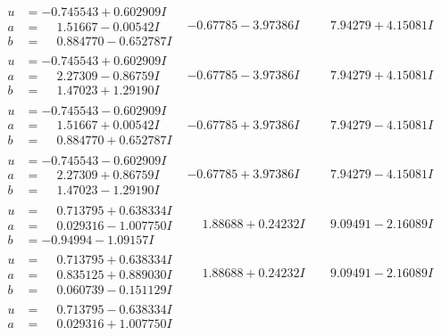 \documentclass[1p]{elsarticle_modified}
\theoremstyle{definition}
\begin{document}
$$\begin{array}{c|c|c}
\begin{aligned}
u &= -0.745543 + 0.602909 I \\
a &= \phantom{-}1.51667 - 0.00542 I \\
b &= \phantom{-}0.884770 - 0.652787 I\end{aligned}
 & -0.67785 - 3.97386 I & \phantom{-}7.94279 + 4.15081 I \\ \hline\begin{aligned}
u &= -0.745543 + 0.602909 I \\
a &= \phantom{-}2.27309 - 0.86759 I \\
b &= \phantom{-}1.47023 + 1.29190 I\end{aligned}
 & -0.67785 - 3.97386 I & \phantom{-}7.94279 + 4.15081 I \\ \hline\begin{aligned}
u &= -0.745543 - 0.602909 I \\
a &= \phantom{-}1.51667 + 0.00542 I \\
b &= \phantom{-}0.884770 + 0.652787 I\end{aligned}
 & -0.67785 + 3.97386 I & \phantom{-}7.94279 - 4.15081 I \\ \hline\begin{aligned}
u &= -0.745543 - 0.602909 I \\
a &= \phantom{-}2.27309 + 0.86759 I \\
b &= \phantom{-}1.47023 - 1.29190 I\end{aligned}
 & -0.67785 + 3.97386 I & \phantom{-}7.94279 - 4.15081 I \\ \hline\begin{aligned}
u &= \phantom{-}0.713795 + 0.638334 I \\
a &= \phantom{-}0.029316 - 1.007750 I \\
b &= -0.94994 - 1.09157 I\end{aligned}
 & \phantom{-}1.88688 + 0.24232 I & \phantom{-}9.09491 - 2.16089 I \\ \hline\begin{aligned}
u &= \phantom{-}0.713795 + 0.638334 I \\
a &= \phantom{-}0.835125 + 0.889030 I \\
b &= \phantom{-}0.060739 - 0.151129 I\end{aligned}
 & \phantom{-}1.88688 + 0.24232 I & \phantom{-}9.09491 - 2.16089 I \\ \hline\begin{aligned}
u &= \phantom{-}0.713795 - 0.638334 I \\
a &= \phantom{-}0.029316 + 1.007750 I \\

\end{aligned}
\end{array}$$
\end{document}

